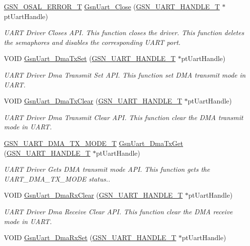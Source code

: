 \begin{DoxyCompactItemize}
\hyperlink{a00659_ga36216a7aacd1d5024bc7b8bf39c3f46b}{GSN\_\-OSAL\_\-ERROR\_\-T} \hyperlink{a00656_ga791dc8834d7d8198f38b487da9af0536}{GsnUart\_\-Close} (\hyperlink{a00266}{GSN\_\-UART\_\-HANDLE\_\-T} $\ast$ptUartHandle)
\begin{DoxyCompactList}\small\item\em UART Driver Closes API. This function closes the driver. This function deletes the semaphores and disables the corresponding UART port. \end{DoxyCompactList}\item 
VOID \hyperlink{a00656_ga31a275eaf10b35ae705b9f8a7bd69949}{GsnUart\_\-DmaTxSet} (\hyperlink{a00266}{GSN\_\-UART\_\-HANDLE\_\-T} $\ast$ptUartHandle)
\begin{DoxyCompactList}\small\item\em UART Driver Dma Transmit Set API. This function set DMA transmit mode in UART. \end{DoxyCompactList}\item 
VOID \hyperlink{a00656_gad84018c54ca6499f277fbe9997103157}{GsnUart\_\-DmaTxClear} (\hyperlink{a00266}{GSN\_\-UART\_\-HANDLE\_\-T} $\ast$ptUartHandle)
\begin{DoxyCompactList}\small\item\em UART Driver Dma Transmit Clear API. This function clear the DMA transmit mode in UART. \end{DoxyCompactList}\item 
\hyperlink{a00656_gaca97ddd99d6a776d3991457a1113f687}{GSN\_\-UART\_\-DMA\_\-TX\_\-MODE\_\-T} \hyperlink{a00656_ga338ba361667098d2a1d11aff8a3924fb}{GsnUart\_\-DmaTxGet} (\hyperlink{a00266}{GSN\_\-UART\_\-HANDLE\_\-T} $\ast$ptUartHandle)
\begin{DoxyCompactList}\small\item\em UART Driver Gets DMA transmit mode API. This function gets the UART\_\-DMA\_\-TX\_\-MODE status.. \end{DoxyCompactList}\item 
VOID \hyperlink{a00656_ga6a3d0cebdb3eebb40cd6d7e48375fdde}{GsnUart\_\-DmaRxClear} (\hyperlink{a00266}{GSN\_\-UART\_\-HANDLE\_\-T} $\ast$ptUartHandle)
\begin{DoxyCompactList}\small\item\em UART Driver Dma Receive Clear API. This function clear the DMA receive mode in UART. \end{DoxyCompactList}\item 
VOID \hyperlink{a00656_ga120bd7e79427738b0700cfa28a473106}{GsnUart\_\-DmaRxSet} (\hyperlink{a00266}{GSN\_\-UART\_\-HANDLE\_\-T} $\ast$ptUartHandle)

\end{DoxyCompactItemize}
